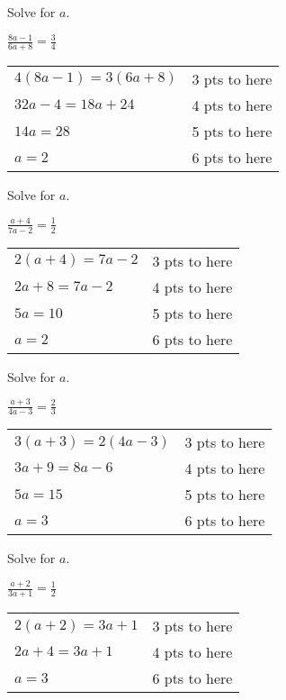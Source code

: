 {
	Solve for $a$.\par
	$\displaystyle \frac{8a-1}{6a+8}=\frac{3}{4}$
}
{
	\begin{tabular}{l r}
	$4(8a-1)=3(6a+8)$ & 3 pts to here\\
	$32a-4=18a+24$ & 4 pts to here\\
	$14a=28$ & 5 pts to here\\
	$a=2$ & 6 pts to here\\
	\end{tabular}
}

{
	Solve for $a$.\par
	$\displaystyle \frac{a+4}{7a-2}=\frac{1}{2}$
}
{
	\begin{tabular}{l r}
	$2(a+4)=7a-2$ & 3 pts to here\\
	$2a+8=7a-2$ & 4 pts to here\\
	$5a=10$ & 5 pts to here\\
	$a=2$ & 6 pts to here\\
	\end{tabular}
}

{
	Solve for $a$.\par
	$\displaystyle \frac{a+3}{4a-3}=\frac{2}{3}$
}
{
	\begin{tabular}{l r}
	$3(a+3)=2(4a-3)$ & 3 pts to here\\
	$3a+9=8a-6$ & 4 pts to here\\
	$5a=15$ & 5 pts to here\\
	$a=3$ & 6 pts to here\\
	\end{tabular}
}

{
	Solve for $a$.\par
	$\displaystyle \frac{a+2}{3a+1}=\frac{1}{2}$
}
{
	\begin{tabular}{l r}
	$2(a+2)=3a+1$ & 3 pts to here\\
	$2a+4=3a+1$ & 4 pts to here\\
	$a=3$ & 6 pts to here\\
	\end{tabular}
}

